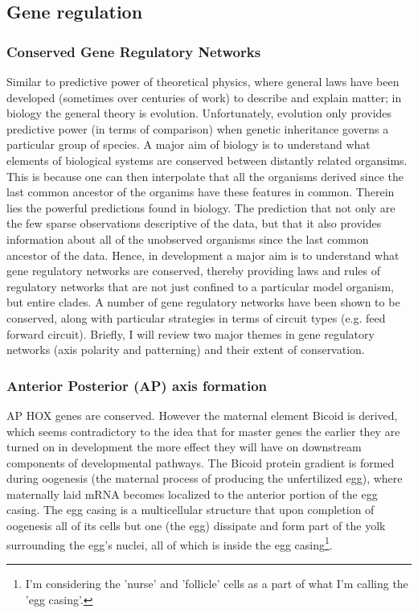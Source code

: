  

\subsection{Gene regulation}

  
\subsubsection{Conserved Gene Regulatory Networks}
	Similar to predictive power of theoretical physics, where general laws have been developed (sometimes over centuries of work) to describe and explain matter; in biology the general theory is evolution.  Unfortunately, evolution only provides predictive power (in terms of comparison) when genetic inheritance governs a particular group of species.  A major aim of biology is to understand what elements of biological systems are conserved between distantly related organsims.  This is because one can then interpolate that all the organisms derived since the last common ancestor of the organims have these features in common.  Therein lies the powerful predictions found in biology.  The prediction that not only are the few sparse observations descriptive of the data, but that it also provides information about all of the unobserved organisms since the last common ancestor of the data.  Hence, in development a major aim is to understand what gene regulatory networks are conserved, thereby providing laws and rules of regulatory networks that are not just confined to a particular model organism, but entire clades.  A number of gene regulatory networks have been shown to be conserved, along with particular strategies in terms of circuit types (e.g. feed forward circuit).  Briefly, I will review two major themes in gene regulatory networks (axis polarity and patterning) and their extent of conservation.
\subsubsection{Anterior Posterior (AP) axis formation}
AP HOX genes are conserved.  However the maternal element Bicoid is derived, which seems contradictory to the idea that for master genes the earlier they are turned on in development the more effect they will have on downstream components of developmental pathways.  The Bicoid protein gradient is formed during oogenesis (the maternal process of producing the unfertilized egg), where maternally laid mRNA becomes localized to the anterior portion of the egg casing.  The egg casing is a multicellular structure that upon completion of oogenesis all of its cells but one (the egg) dissipate and form part of the yolk surrounding the egg's nuclei, all of which is inside the egg casing\footnote{I'm considering the 'nurse' and 'follicle' cells as a part of what I'm calling the 'egg casing'.}.

